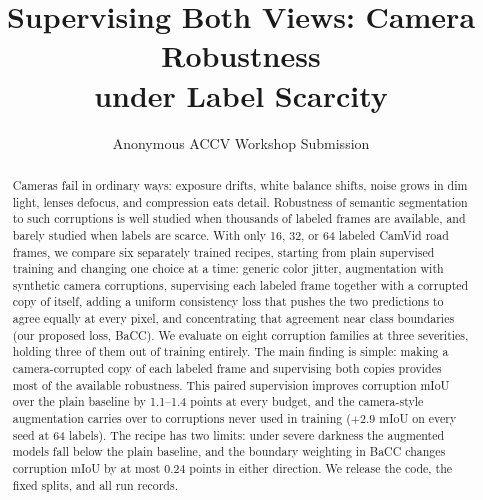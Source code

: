 \documentclass[runningheads]{llncs}
\newcommand{\method}{BaCC}
\begin{document}
\title{Supervising Both Views: Camera Robustness\\
under Label Scarcity}

\author{Anonymous ACCV Workshop Submission}

\maketitle

\begin{abstract}
Cameras fail in ordinary ways: exposure drifts, white balance shifts, noise
grows in dim light, lenses defocus, and compression eats detail. Robustness of
semantic segmentation to such corruptions is well studied when thousands of
labeled frames are available, and barely studied when labels are scarce. With
only 16, 32, or 64 labeled CamVid road frames, we compare six separately
trained recipes, starting from plain supervised training and changing one
choice at a time: generic color jitter, augmentation with synthetic camera
corruptions, supervising each labeled frame together
with a corrupted copy of itself, adding a uniform consistency loss that pushes the
two predictions to agree equally at every pixel, and concentrating that
agreement near class boundaries (our proposed loss, \method{}). We evaluate on eight corruption families at three
severities, holding three of them out of training entirely. The main finding is simple: making a
camera-corrupted copy of each labeled frame and supervising both copies
provides most of the available robustness. This paired
supervision improves corruption mIoU over the plain baseline by 1.1--1.4
points at every budget, and the camera-style augmentation carries over to
corruptions never used in training ($+2.9$ mIoU on every seed at 64 labels).
The recipe has two limits: under severe darkness the augmented models fall
below the plain baseline, and the boundary weighting in \method{}
changes corruption mIoU by at most 0.24 points in either direction. We release the code, the
fixed splits, and all run records.

\end{abstract}
\end{document}
